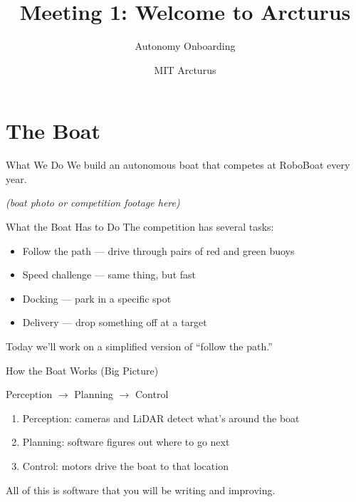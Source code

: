 \documentclass[aspectratio=169]{beamer}
\title{Meeting 1: Welcome to Arcturus}
\subtitle{Autonomy Onboarding}
\author{MIT Arcturus}
\date{}
\begin{document}
\begin{frame}
    \titlepage
\end{frame}

\section{The Boat}

\begin{frame}{What We Do}
    We build an autonomous boat that competes at RoboBoat every year.
    \vfill
    \begin{center}
        \textit{(boat photo or competition footage here)}
    \end{center}
\end{frame}

\begin{frame}{What the Boat Has to Do}
    The competition has several tasks:
    \vfill
    \begin{itemize}
        \item Follow the path --- drive through pairs of red and green buoys
        \item Speed challenge --- same thing, but fast
        \item Docking --- park in a specific spot
        \item Delivery --- drop something off at a target
    \end{itemize}
    \vfill
    Today we'll work on a simplified version of ``follow the path.''
\end{frame}

\begin{frame}{How the Boat Works (Big Picture)}
    \begin{center}
        \Large
        Perception $\rightarrow$ Planning $\rightarrow$ Control
    \end{center}
    \vfill
    \begin{enumerate}
        \item Perception: cameras and LiDAR detect what's around the boat
        \item Planning: software figures out where to go next
        \item Control: motors drive the boat to that location
    \end{enumerate}
    \vfill
    All of this is software that you will be writing and improving.
\end{frame}
\end{document}
